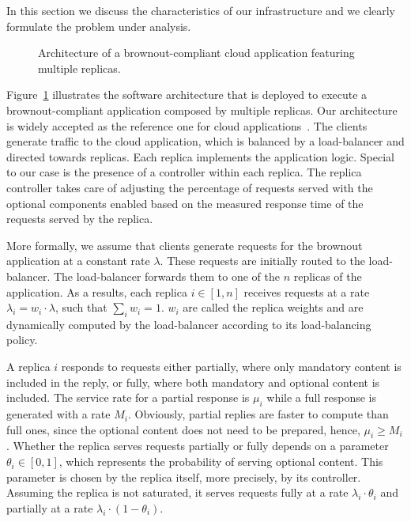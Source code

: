 In this section we discuss the characteristics of our infrastructure
and we clearly formulate the problem under analysis.

\begin{figure}[t]
  \centering 
   
  \caption{Architecture of a brownout-compliant cloud application
    featuring multiple replicas.}
  \label{fig:architecture}
\end{figure}

Figure~\ref{fig:architecture} illustrates the software architecture
that is deployed to execute a brownout-compliant application composed
by multiple replicas. Our architecture is widely accepted as the
reference one for cloud applications~\citep{Barroso09}. The clients
generate traffic to the cloud application, which is balanced by a
load-balancer and directed towards replicas. Each replica implements
the application logic. Special to our case is the presence of a
controller within each replica. The replica controller takes care of
adjusting the percentage of requests served with the optional
components enabled based on the measured response time of the requests
served by the replica.

More formally, we assume that clients generate requests for the
brownout application at a constant rate $\lambda$. These requests are
initially routed to the load-balancer. The load-balancer forwards them
to one of the $n$ replicas of the application. As a results, each
replica $i \in [1,n]$ receives requests at a rate $\lambda_i = w_i
\cdot \lambda$, such that $\sum_{i} w_i = 1$. $w_i$ are called the
replica weights and are dynamically computed by the load-balancer
according to its load-balancing policy.

A replica $i$ responds to requests either partially, where only
mandatory content is included in the reply, or fully, where both
mandatory and optional content is included. The service rate for a
partial response is $\mu_i$ while a full response is generated with a
rate $M_i$. Obviously, partial replies are faster to compute than full
ones, since the optional content does not need to be prepared, hence,
$\mu_i \geq M_i$. Whether the replica serves requests partially or
fully depends on a parameter $\theta_i \in [0, 1]$, which represents
the probability of serving optional content. This parameter is chosen
by the replica itself, more precisely, by its controller. Assuming the
replica is not saturated, it serves requests fully at a rate
$\lambda_i \cdot \theta_i$ and partially at a rate $\lambda_i \cdot
(1-\theta_i)$. 

